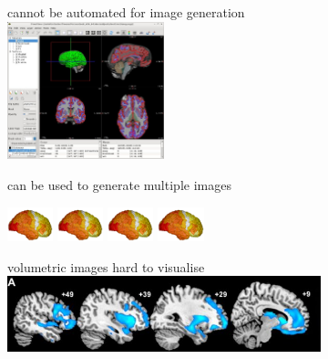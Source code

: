 \documentclass[10pt,xcolor=table,aspectratio=169]{beamer}
\begin{document}
\begin{frame}[t]
\begin{figure}
\begin{subfigure}[t]{0.3\textwidth}
\end{subfigure}
\begin{subfigure}[t]{0.3\textwidth}
\centering
 \begin{minipage}[t][3.5cm][t]{\textwidth}
 \centering
\myno cannot be automated for image generation\\
\includegraphics[width=0.5\textwidth]{images/freeviewInterface.jpg}
 \end{minipage}


\myyes can be used to generate multiple images

\includegraphics[height=1cm,trim=0 0 900 0]{images/brainTransparent} 
\includegraphics[height=1cm,trim=0 0 900 0]{images/brainTransparent} 
\includegraphics[height=1cm,trim=0 0 900 0]{images/brainTransparent} 
\includegraphics[height=1cm]{images/brainTransparent} 



\end{subfigure}
\begin{subfigure}[t]{0.3\textwidth}
\centering
 \begin{minipage}[t][3.5cm][t]{\textwidth}
 \centering
\myno volumetric images hard to visualise\\
\vspace{1.5em}
\includegraphics[width=\textwidth]{images/seeleyImages} 
\vspace{1.0em}
 \end{minipage}



\end{subfigure}
\end{figure}
\end{frame}
\end{document}
